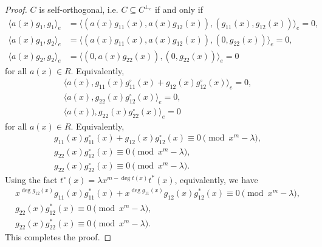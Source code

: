 \documentclass[12 pt]{extarticle}
\numberwithin{equation}{section}
\theoremstyle{definition}
\begin{document}
\begin{proof}
    $C$ is self-orthogonal, i.e. $C\subseteq C^{\perp_e}$ if and only if
\begin{equation*}
    \begin{split}
        \langle a(x)g_1,g_1\rangle_e&=\langle (a(x)g_{11}(x),a(x)g_{12}(x)),(g_{11}(x),g_{12}(x))\rangle_e=0,\\
        \langle a(x)g_1,g_2\rangle_e&=\langle (a(x)g_{11}(x),a(x)g_{12}(x)),(0,g_{22}(x)) \rangle_e=0,\\
        \langle a(x)g_2,g_2\rangle_e&=\langle (0,a(x)g_{22}(x)),(0,g_{22}(x)) \rangle_e=0
    \end{split}
\end{equation*}
for all $a(x)\in R$. Equivalently,
\begin{equation*}
    \begin{split}
   \langle a(x),g_{11}(x)g_{11}^\circ(x)+g_{12}(x)g_{12}^\circ(x)\rangle_e=0,\\
        \langle a(x), g_{22}(x)g_{12}^\circ(x)\rangle_e=0,\\
        \langle a(x)),g_{22}(x)g_{22}^\circ(x) \rangle_e=0
    \end{split}
\end{equation*}
for all $a(x)\in R$. Equivalently,
\begin{equation*}
    \begin{split}
        g_{11}(x)g_{11}^\circ(x)+g_{12}(x)g_{12}^\circ(x)\equiv 0\pmod{x^m-\lambda},\\
        g_{22}(x)g_{12}^\circ(x)\equiv 0\pmod{x^m-\lambda},\\
        g_{22}(x)g_{22}^\circ(x)\equiv 0\pmod{x^m-\lambda}.
    \end{split}
\end{equation*}
Using the fact $t^\circ(x)= \lambda x^{m-\deg t(x)}t^*(x)$, equivalently, we have
\begin{equation*}
    \begin{split}
        x^{\deg g_{12}(x)} g_{11}(x)g_{11}^*(x)+x^{\deg g_{11}(x)}g_{12}(x)g_{12}^*(x)\equiv 0\pmod{x^m-\lambda},\\
        g_{22}(x)g_{12}^*(x)\equiv 0\pmod{x^m-\lambda},\\
        g_{22}(x)g_{22}^*(x)\equiv 0\pmod{x^m-\lambda}.
    \end{split}
\end{equation*}
This completes the proof.
\end{proof}
\end{document}
